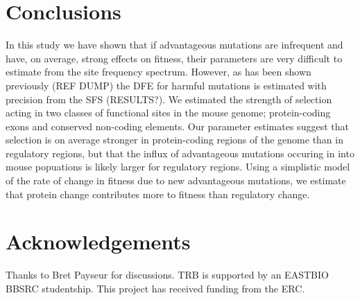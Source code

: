 \documentclass[11pt]{article}
\begin{document}
\section*{Conclusions}

In this study we have shown that if advantageous mutations are infrequent and have, on average, strong effects on fitness, their parameters are very difficult to estimate from the site frequency spectrum. However, as has been shown previously (REF DUMP) the DFE for harmful mutations is estimated with precision from the SFS (RESULTS?). We estimated the strength of selection acting in two classes of functional sites in the mouse genome; protein-coding exons and conserved non-coding elements. Our parameter estimates suggest that selection is on average stronger in protein-coding regions of the genome than in regulatory regions, but that the influx of advantageous mutations occuring in into mouse popuations is likely larger for regulatory regions. Using a simplistic model of the rate of change in fitness due to new advantageous mutations, we estimate that protein change contributes more to fitness than regulatory change.

\section*{Acknowledgements}

Thanks to Bret Payseur for discussions. TRB is supported by an EASTBIO BBSRC studentship. This project has received funding from the ERC.
\end{document}
